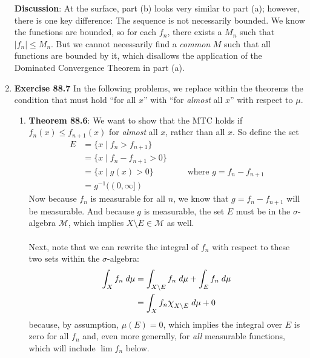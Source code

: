 \documentclass[12pt]{article}
\theoremstyle{plain}
\theoremstyle{definition}
\theoremstyle{remark}
\newcommand*{\Chi}{\mbox{\large$\chi$}} %
\begin{document}
\begin{enumerate}
\textbf{Discussion}: At the surface, part (b) looks very similar to part (a); however, there is one key difference: The sequence is not necessarily bounded. We know the functions are bounded, so for each $f_n$, there exists a $M_n$ such that $|f_n|\leq M_n$. But we cannot necessarily find a \emph{common} $M$ such that all functions are bounded by it, which disallows the application of the Dominated Convergence Theorem in part (a).

\newpage
\item \textbf{Exercise 88.7} In the following problems, we replace within the theorems the condition that must hold ``for all $x$'' with ``for \emph{almost} all $x$'' with respect to $\mu$.
\begin{enumerate}
    \item \textbf{Theorem 88.6}: We want to show that the MTC holds if $f_n(x)\leq f_{n+1}(x)$ for \emph{almost} all $x$, rather than all $x$. So define the set
\begin{align*}
    E &= \{x \; | \; f_n > f_{n+1}\} \\
        &= \{x \; | \; f_n - f_{n+1} > 0\} \\
        &= \{x \; | \; g(x) > 0\} \qquad \qquad
        \text{where $g=f_n - f_{n+1}$} \\
    &= g^{-1}((0,\infty]) 
\end{align*}
Now because $f_n$ is measurable for all $n$, we know that $g=f_n-f_{n+1}$ will be measurable. And because $g$ is measurable, the set $E$ must be in the $\sigma$-algebra $\mathscr{M}$, which implies $X\setminus E\in\mathscr{M}$ as well.
\\
\\
Next, note that we can rewrite the integral of $f_n$ with respect to these two sets within the $\sigma$-algebra:
\begin{align*}
    \int_X f_n \; d\mu &= \int_{X\setminus E} f_n \; d\mu
    + \int_E f_n \; d\mu\\
    &= \int_X f_n \Chi_{X\setminus E} \; d\mu+ 0
\end{align*}
because, by assumption, $\mu(E)=0$, which implies the integral over $E$ is zero for all $f_n$ and, even more generally, for \emph{all} measurable functions, which will include $\lim f_n$ below. 


\end{enumerate}
\end{enumerate}
\end{document}
